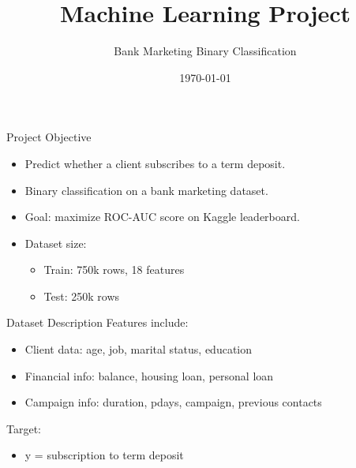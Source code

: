 \documentclass[slidescentered]{beamer}
\title{Machine Learning Project}
\subtitle{Bank Marketing Binary Classification}
\date{\today}
\begin{document}
\begin{frame}[noframenumbering]
\titlepage
\end{frame}

\begin{frame}{Project Objective}
\begin{itemize}
\item Predict whether a client subscribes to a term deposit.
\item Binary classification on a bank marketing dataset.
\item Goal: maximize ROC-AUC score on Kaggle leaderboard.
\item Dataset size: 
\begin{itemize}
\item Train: 750k rows, 18 features
\item Test: 250k rows
\end{itemize}
\end{itemize}
\end{frame}

\begin{frame}{Dataset Description}
Features include:
\begin{itemize}
\item Client data: age, job, marital status, education
\item Financial info: balance, housing loan, personal loan
\item Campaign info: duration, pdays, campaign, previous contacts
\end{itemize}
Target:
\begin{itemize}
\item y = subscription to term deposit
\end{itemize}
\end{frame}
\end{document}
